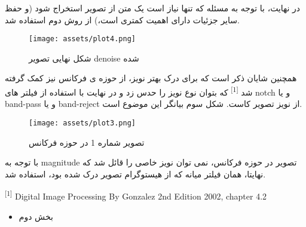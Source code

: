 \documentclass[a4paper,12pt]{article}
\begin{document}
در نهایت، با توجه به مسئله که تنها نیاز است یک متن از تصویر استخراج شود (و حفظ سایر جزئیات دارای اهمیت کمتری است،) از روش دوم استفاده شد.

\begin{figure}[h]
	\centering
	\texttt{[image: assets/plot4.png]}
	\caption{\textcolor{CustomAccent}{شکل نهایی تصویر denoise شده}}
\end{figure}

\pagebreak

همچنین شایان ذکر است که برای درک بهتر نویز، از حوزه ی فرکانس نیز کمک گرفته شد
 \textsuperscript{[1]}  که بتوان نوع نویز را حدس زد و در نهایت با استفاده از فیلتر های notch و یا band-pass و یا band-reject از نویز تصویر کاست. شکل سوم بیانگر این موضوع است.

\begin{figure}[h]
	\centering
	\texttt{[image: assets/plot3.png]}
	\caption{\textcolor{CustomAccent}{تصویر شماره 1 در حوزه فرکانس}}
\end{figure}

با توجه به magnitude تصویر در حوزه فرکانس، نمی توان نویز خاصی را قائل شد که نهایتا، همان فیلتر میانه که از هیستوگرام تصویر درک شده بود، استفاده شد.


\vfill
\hline
\begin{LTR}
	\begin{latin}
		\begin{center}
			\begin{minipage}{0.9\linewidth}
				\small %
				\textsuperscript{[1]} Digital Image Processing By Gonzalez 2nd Edition 2002, chapter 4.2
			\end{minipage}
		\end{center}
	\end{latin}
\end{LTR}
%
%
\pagebreak
\begin{itemize}
\item 
بخش دوم
\end{itemize}
\end{document}
